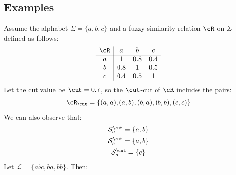 \subsection*{Examples}
Assume the alphabet $\Sigma = \{a, b, c\}$ and a fuzzy similarity relation $\cR$ on $\Sigma$ defined as follows:
\[
\begin{array}{c|ccc}
\cR & a & b & c \\
\hline
a & 1 & 0.8 & 0.4 \\
b & 0.8 & 1 & 0.5 \\
c & 0.4 & 0.5 & 1 \\
\end{array}
\]
Let the cut value be $\cut = 0.7$, so the $\cut$-cut of $\cR$ includes the pairs:
\[
\cR_\cut = \{(a, a), (a, b), (b, a), (b, b), (c, c)\}
\]
We can also observe that:
\[
\begin{array}{c}
     \mathcal{S}_a^\cut=\{a, b\} \\ [1ex]
     \mathcal{S}_b^\cut=\{a, b\} \\ [1ex]
     \mathcal{S}_a^\cut=\{c\}
\end{array}
\]
\noindent
Let $\mathcal{L} = \{abc, ba, bb\}$. Then:
